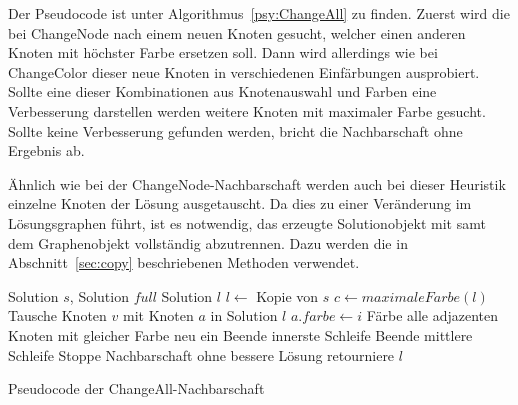Der Pseudocode ist unter Algorithmus~\ref{psy:ChangeAll} zu finden. Zuerst wird die bei ChangeNode nach einem neuen Knoten gesucht, welcher einen anderen Knoten mit höchster Farbe ersetzen soll. Dann wird
allerdings wie bei ChangeColor dieser neue Knoten in verschiedenen Einfärbungen ausprobiert. Sollte eine dieser Kombinationen aus Knotenauswahl und Farben eine Verbesserung darstellen werden weitere Knoten
mit maximaler Farbe gesucht. Sollte keine Verbesserung gefunden werden, bricht die Nachbarschaft ohne Ergebnis ab.

Ähnlich wie bei der ChangeNode-Nachbarschaft werden auch bei dieser Heuristik einzelne Knoten der Lösung ausgetauscht. Da dies zu einer Veränderung im Lösungsgraphen führt, ist es notwendig, das erzeugte
Solutionobjekt mit samt dem Graphenobjekt vollständig abzutrennen. Dazu werden die in Abschnitt~\ref{sec:copy} beschriebenen Methoden verwendet.

\begin{algorithm}
\begin{algorithmic}[1]
\Require Solution $s$, Solution $full$
\Ensure Solution $l$
\State $l \leftarrow$ Kopie von $s$
\State $c \leftarrow maximaleFarbe(l)$
\State Tausche Knoten $v$ mit Knoten $a$ in Solution $l$
\State $a.farbe \leftarrow i$
\State Färbe alle adjazenten Knoten mit gleicher Farbe neu ein
\State Beende innerste Schleife  
\EndIf
\EndFor
{}
\State Beende mittlere Schleife  
\EndIf
\EndFor
{}
\State Stoppe Nachbarschaft ohne bessere Lösung
\EndIf
\EndFor
\State retourniere $l$
\end{algorithmic}
\caption{Pseudocode der ChangeAll-Nachbarschaft}
\label{psy:ChangeAll}
\end{algorithm}
 
